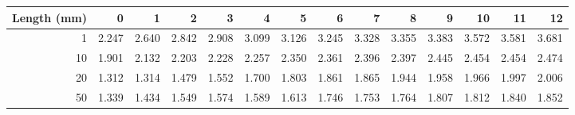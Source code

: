 \begin{tabular}{rrrrrrrrrrrrrr}
\toprule
 Length (mm) &      0 &      1 &      2 &      3 &      4 &      5 &      6 &      7 &      8 &      9 &     10 &     11 &     12 \\
\midrule
           1 &  2.247 &  2.640 &  2.842 &  2.908 &  3.099 &  3.126 &  3.245 &  3.328 &  3.355 &  3.383 &  3.572 &  3.581 &  3.681 \\
          10 &  1.901 &  2.132 &  2.203 &  2.228 &  2.257 &  2.350 &  2.361 &  2.396 &  2.397 &  2.445 &  2.454 &  2.454 &  2.474 \\
          20 &  1.312 &  1.314 &  1.479 &  1.552 &  1.700 &  1.803 &  1.861 &  1.865 &  1.944 &  1.958 &  1.966 &  1.997 &  2.006 \\
          50 &  1.339 &  1.434 &  1.549 &  1.574 &  1.589 &  1.613 &  1.746 &  1.753 &  1.764 &  1.807 &  1.812 &  1.840 &  1.852 \\
\bottomrule
\end{tabular}
